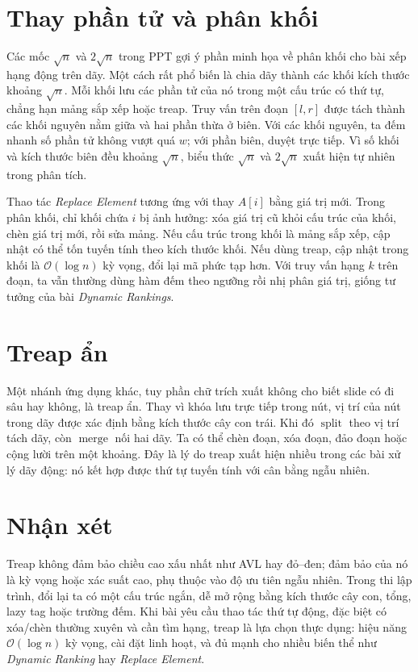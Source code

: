 \documentclass[11pt]{article}
\newcommand{\Oh}{\mathcal{O}}
\begin{document}
\section{Thay phần tử và phân khối}

Các mốc \(\sqrt n\) và \(2\sqrt n\) trong PPT gợi ý phần minh họa về phân
khối cho bài xếp hạng động trên dãy. Một cách rất phổ biến là chia dãy thành
các khối kích thước khoảng \(\sqrt n\). Mỗi khối lưu các phần tử của nó trong
một cấu trúc có thứ tự, chẳng hạn mảng sắp xếp hoặc treap. Truy vấn trên đoạn
\([l,r]\) được tách thành các khối nguyên nằm giữa và hai phần thừa ở biên.
Với các khối nguyên, ta đếm nhanh số phần tử không vượt quá \(w\); với phần
biên, duyệt trực tiếp. Vì số khối và kích thước biên đều khoảng \(\sqrt n\),
biểu thức \(\sqrt n\) và \(2\sqrt n\) xuất hiện tự nhiên trong phân tích.

Thao tác \textit{Replace Element} tương ứng với thay \(A[i]\) bằng giá trị
mới. Trong phân khối, chỉ khối chứa \(i\) bị ảnh hưởng: xóa giá trị cũ khỏi
cấu trúc của khối, chèn giá trị mới, rồi sửa mảng. Nếu cấu trúc trong khối là
mảng sắp xếp, cập nhật có thể tốn tuyến tính theo kích thước khối. Nếu dùng
treap, cập nhật trong khối là \(\Oh(\log n)\) kỳ vọng, đổi lại mã phức tạp
hơn. Với truy vấn hạng \(k\) trên đoạn, ta vẫn thường dùng hàm đếm theo
ngưỡng rồi nhị phân giá trị, giống tư tưởng của bài \textit{Dynamic Rankings}.

\section{Treap ẩn}

Một nhánh ứng dụng khác, tuy phần chữ trích xuất không cho biết slide có đi
sâu hay không, là treap ẩn. Thay vì khóa lưu trực tiếp trong nút, vị trí của
nút trong dãy được xác định bằng kích thước cây con trái. Khi đó
\(\operatorname{split}\) theo vị trí tách dãy, còn \(\operatorname{merge}\)
nối hai dãy. Ta có thể chèn đoạn, xóa đoạn, đảo đoạn hoặc cộng lười trên một
khoảng. Đây là lý do treap xuất hiện nhiều trong các bài xử lý dãy động: nó
kết hợp được thứ tự tuyến tính với cân bằng ngẫu nhiên.

\section{Nhận xét}

Treap không đảm bảo chiều cao xấu nhất như AVL hay đỏ--đen; đảm bảo của nó là
kỳ vọng hoặc xác suất cao, phụ thuộc vào độ ưu tiên ngẫu nhiên. Trong thi lập
trình, đổi lại ta có một cấu trúc ngắn, dễ mở rộng bằng kích thước cây con,
tổng, lazy tag hoặc trường đếm. Khi bài yêu cầu thao tác thứ tự động, đặc biệt
có xóa/chèn thường xuyên và cần tìm hạng, treap là lựa chọn thực dụng: hiệu
năng \(\Oh(\log n)\) kỳ vọng, cài đặt linh hoạt, và đủ mạnh cho nhiều biến thể
như \textit{Dynamic Ranking} hay \textit{Replace Element}.
\end{document}
